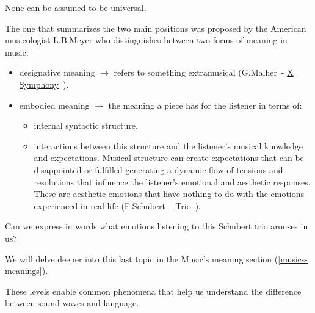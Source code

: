 None can be assumed to be universal.

The one that summarizes the two main positions was proposed by the American musicologist L.B.Meyer who distinguishes between two forms of meaning in music:

\begin{itemize}
\tightlist\item designative meaning \(\rightarrow\) refers to something extramusical (G.Malher~- \href{http://www.musicaecodice.it/on_server/media/1_media/malher.mp3}{X Symphony}~\cite{malher_x}).
\item embodied meaning \(\rightarrow\) the meaning a piece has for the listener in terms of:

  \begin{itemize}
  \tightlist\item internal syntactic structure.
  \item interactions between this structure and the listener's musical knowledge and expectations. Musical structure can create expectations that can be disappointed or fulfilled generating a dynamic flow of tensions and resolutions that influence the listener's emotional and aesthetic responses. These are aesthetic emotions that have nothing to do with the emotions experienced in real life (F.Schubert~- \href{http://www.musicaecodice.it/on_server/media/1_media/schubert.mp3}{Trio}~\cite{schubert_trio}).
  \end{itemize}
\end{itemize}

Can we express in words what emotions listening to this Schubert trio arouses in us?

We will delve deeper into this last topic in the Music’s meaning section (\ref{musics-meanings}).

These levels enable common phenomena that help us understand the difference between sound waves and language.

